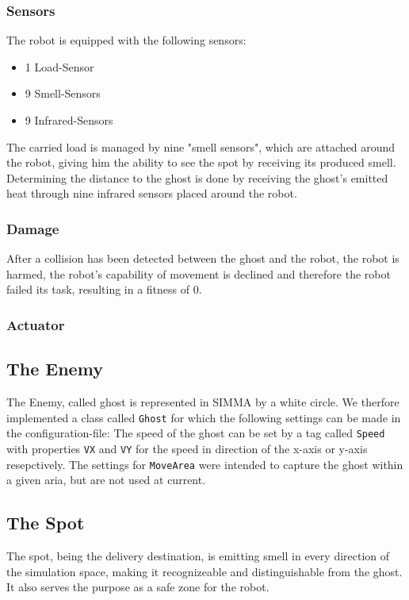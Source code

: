 \documentclass[12pt,fleqn,a4paper]{article}
\begin{document}

\subsubsection{Sensors}
The robot is equipped with the following sensors:
\begin{itemize}
    \item 1 Load-Sensor
    \item 9 Smell-Sensors
    \item 9 Infrared-Sensors
\end{itemize}
The carried load is managed by nine "smell sensors", which are attached around the robot, giving him the ability to see the spot by receiving its produced smell. Determining the distance to the ghost is done by receiving the ghost's emitted heat through nine infrared sensors placed around the robot.

\subsubsection{Damage}
After a collision has been detected between the ghost and the robot, the robot is harmed, the robot's capability of movement is declined and therefore the robot failed its task, resulting in a fitness of 0.

\subsubsection{Actuator}


\subsection{The Enemy}

The Enemy, called ghost is represented in SIMMA by a white circle. We therfore implemented a class called \texttt{Ghost} for which the following settings can be made in the configuration-file: The speed of the ghost can be set by a tag called \texttt{Speed} with properties \texttt{VX} and \texttt{VY} for the speed in direction of the x-axis or y-axis resepctively. The settings for \texttt{MoveArea} were intended to capture the ghost within a given aria, but are not used at current.

\subsection{The Spot}
The spot, being the delivery destination, is emitting smell in every direction of the simulation space, making it recognizeable and distinguishable from the ghost. It also serves the purpose as a safe zone for the robot.
\end{document}
